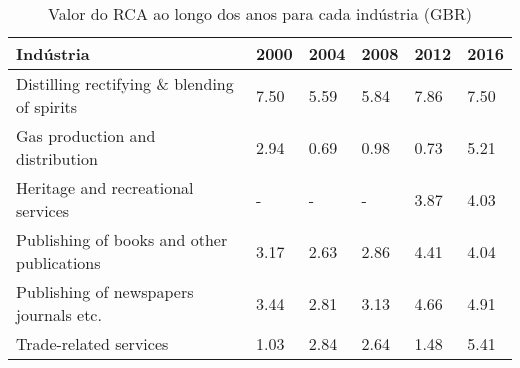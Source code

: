 \begin{table}
\centering
\caption{Valor do RCA ao longo dos anos para cada indústria (GBR)}
\label{tab:ex3-tempo-GBR}
\begin{tabular}{p{6cm}p{1.5cm}p{1.5cm}p{1.5cm}p{1.5cm}p{1.5cm}}
\toprule
                                  Indústria & 2000 & 2004 & 2008 & 2012 & 2016 \\
\midrule
Distilling rectifying \& blending of spirits & 7.50 & 5.59 & 5.84 & 7.86 & 7.50 \\
            Gas production and distribution & 2.94 & 0.69 & 0.98 & 0.73 & 5.21 \\
         Heritage and recreational services &    - &    - &    - & 3.87 & 4.03 \\
 Publishing of books and other publications & 3.17 & 2.63 & 2.86 & 4.41 & 4.04 \\
     Publishing of newspapers journals etc. & 3.44 & 2.81 & 3.13 & 4.66 & 4.91 \\
                     Trade-related services & 1.03 & 2.84 & 2.64 & 1.48 & 5.41 \\
\bottomrule
\end{tabular}
\end{table}
